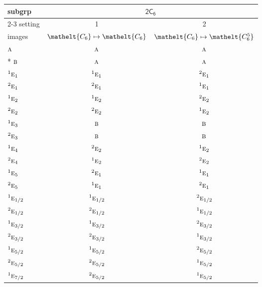 \documentclass[10pt,a4paper]{article}
\numberwithin{equation}{section}
\newcommand{\eltfont}[1]{{\let\sigma\eltsigma\mathelt{#1}}}
\newcommand{\grp}[1]{\mathsf{#1}}
\newcommand{\irr}[1]{\text{\normalfont\scshape #1}}
\newcommand{\conjpair}[1]{{}^{#1}}
\newcommand{\cls}[1]{\eltfont{#1}}
\begin{document}
{\small\begin{longtable}{@{}lcc@{}}\toprule
subgrp & \multicolumn{2}{c}{\href{2C6.pdf}{$\grp{2C_{6}}$}}\\\cmidrule(lr){2-3}
setting & 1 & 2\\
images & {\scriptsize $\cls{C_{6}} \mapsto \cls{C_{6}}$} & {\scriptsize $\cls{C_{6}} \mapsto \cls{C_{6}^{5}}$}\\\midrule\endhead
\bottomrule\endfoot\endlastfoot
$\irr{a}$ & $\irr{a}$ & $\irr{a}$\\*
$\irr{b}$ & $\irr{a}$ & $\irr{a}$\\
$\conjpair{1}\irr{e}_{1}$ & $\conjpair{1}\irr{e}_{1}$ & $\conjpair{2}\irr{e}_{1}$\\
$\conjpair{2}\irr{e}_{1}$ & $\conjpair{2}\irr{e}_{1}$ & $\conjpair{1}\irr{e}_{1}$\\
$\conjpair{1}\irr{e}_{2}$ & $\conjpair{1}\irr{e}_{2}$ & $\conjpair{2}\irr{e}_{2}$\\
$\conjpair{2}\irr{e}_{2}$ & $\conjpair{2}\irr{e}_{2}$ & $\conjpair{1}\irr{e}_{2}$\\
$\conjpair{1}\irr{e}_{3}$ & $\irr{b}$ & $\irr{b}$\\
$\conjpair{2}\irr{e}_{3}$ & $\irr{b}$ & $\irr{b}$\\
$\conjpair{1}\irr{e}_{4}$ & $\conjpair{2}\irr{e}_{2}$ & $\conjpair{1}\irr{e}_{2}$\\
$\conjpair{2}\irr{e}_{4}$ & $\conjpair{1}\irr{e}_{2}$ & $\conjpair{2}\irr{e}_{2}$\\
$\conjpair{1}\irr{e}_{5}$ & $\conjpair{2}\irr{e}_{1}$ & $\conjpair{1}\irr{e}_{1}$\\
$\conjpair{2}\irr{e}_{5}$ & $\conjpair{1}\irr{e}_{1}$ & $\conjpair{2}\irr{e}_{1}$\\
$\conjpair{1}\irr{e}_{1/2}$ & $\conjpair{1}\irr{e}_{1/2}$ & $\conjpair{2}\irr{e}_{1/2}$\\
$\conjpair{2}\irr{e}_{1/2}$ & $\conjpair{2}\irr{e}_{1/2}$ & $\conjpair{1}\irr{e}_{1/2}$\\
$\conjpair{1}\irr{e}_{3/2}$ & $\conjpair{1}\irr{e}_{3/2}$ & $\conjpair{2}\irr{e}_{3/2}$\\
$\conjpair{2}\irr{e}_{3/2}$ & $\conjpair{2}\irr{e}_{3/2}$ & $\conjpair{1}\irr{e}_{3/2}$\\
$\conjpair{1}\irr{e}_{5/2}$ & $\conjpair{1}\irr{e}_{5/2}$ & $\conjpair{2}\irr{e}_{5/2}$\\
$\conjpair{2}\irr{e}_{5/2}$ & $\conjpair{2}\irr{e}_{5/2}$ & $\conjpair{1}\irr{e}_{5/2}$\\
$\conjpair{1}\irr{e}_{7/2}$ & $\conjpair{2}\irr{e}_{5/2}$ & $\conjpair{1}\irr{e}_{5/2}$\\

\end{longtable}}
\end{document}
